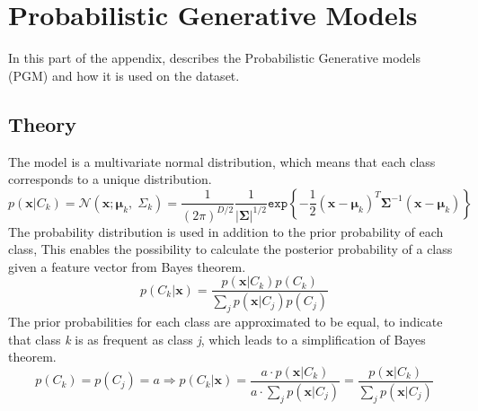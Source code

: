 \chapter{Probabilistic Generative Models}
In this part of the appendix, describes the Probabilistic Generative models (PGM) and how it is used on the dataset.

\section{Theory} 
The model is a multivariate normal distribution, which means that each class corresponds to a unique distribution.
\begin{equation}
p(\mathbf{x}|C_k)=\mathcal{N}(\mathbf{x};\mathbf{\mu}_k, \; \Sigma_k) = \dfrac{1}{(2\pi)^{D/2}} \dfrac{1}{\left|\mathbf{\Sigma} \right|^{1/2}} \mathtt{exp} \left\lbrace -\dfrac{1}{2} (\mathbf{x}-\mathbf{\mu}_k)^T \mathbf{\Sigma}^{-1} (\mathbf{x}-\mathbf{\mu}_k) \right\rbrace
\label{eq:gauss_dist} 
\end{equation}
The probability distribution is used in addition to the prior probability of each class, This enables the possibility to calculate the posterior probability of a class given a feature vector from Bayes theorem.
\begin{equation}
p(C_k |\mathbf{x}) = \dfrac{p(\mathbf{x}|C_k) p(C_k)}{\sum_j p(\mathbf{x}|C_j) p(C_j)}
\label{eq:posteriorP}
\end{equation}
The prior probabilities for each class are approximated to be equal, to indicate that class \textit{k} is as frequent as class \textit{j}, which leads to a simplification of Bayes theorem.
\begin{equation}
p(C_k) = p(C_j) = a \Longrightarrow p(C_k |\mathbf{x}) = \dfrac{a \cdot p(\mathbf{x}|C_k) }{a \cdot \sum_j p(\mathbf{x}|C_j) } = \dfrac{p(\mathbf{x}|C_k)}{\sum_j p(\mathbf{x}|C_j)}
\label{eq:posteriorPsimple}
\end{equation}

